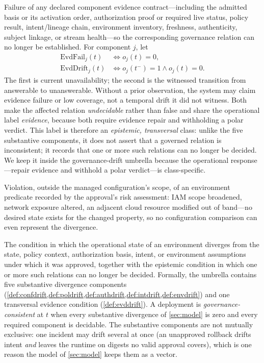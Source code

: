 \begin{definition}
\label{def:evddrift}
Failure of any declared component evidence contract---including the admitted
basis or its activation order, authorization proof or required live status,
policy result, intent/lineage chain, environment inventory, freshness,
authenticity, subject linkage, or stream health---so the corresponding
governance relation can no longer be established. For component $j$, let
\[
\begin{aligned}
\mathrm{EvdFail}_j(t)&\iff o_j(t)=0,\\
\mathrm{EvdDrift}_j(t)&\iff o_j(t^-)=1\land o_j(t)=0.
\end{aligned}
\]
The first is current unavailability; the second is the witnessed transition
from answerable to unanswerable. Without a prior observation, the system may
claim evidence failure or low coverage, not a temporal drift it did not
witness. Both make the affected relation \emph{undecidable} rather than false
and share the operational label \emph{evidence}, because both require evidence
repair and withholding a polar verdict. This label is therefore an
\emph{epistemic, transversal} class: unlike the five substantive components,
it does not assert that a governed relation is inconsistent; it records that
one or more such relations can no longer be decided. We keep it inside the
governance-drift umbrella because the operational response---repair evidence
and withhold a polar verdict---is class-specific.
\end{definition}

\begin{definition}
\label{def:envdrift}
Violation, outside the managed configuration's scope, of an environment
predicate recorded by the approval's risk assessment: IAM scope broadened,
network exposure altered, an adjacent cloud resource modified out of
band---no desired state exists for the changed property, so no
configuration comparison can even represent the divergence.
\end{definition}

\begin{definition}
\label{def:govdrift}
The condition in which the operational state of an environment diverges from
the state, policy context, authorization basis, intent, or environment
assumptions under which it was approved, together with the epistemic condition
in which one or more such relations can no longer be decided. Formally, the
umbrella contains five substantive divergence components
(\cref{def:confdrift,def:poldrift,def:authdrift,def:intdrift,def:envdrift})
and one transversal evidence condition (\cref{def:evddrift}). A deployment is
\emph{governance-consistent} at $t$ when every substantive divergence of
\cref{sec:model} is zero and every required component is decidable. The
substantive components are not mutually exclusive: one incident may
drift several at once (an unapproved rollback drifts intent \emph{and}
leaves the runtime on digests no valid approval covers), which is one reason
the model of \cref{sec:model} keeps them as a vector.
\end{definition}

